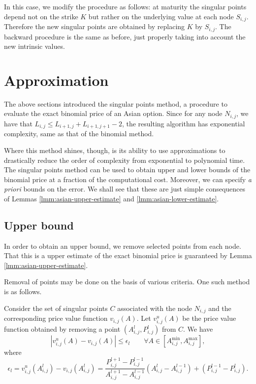 \begin{rem}[Floating]
	In this case, we modify the procedure as follows: at maturity the singular points depend not on the strike $ K $ but rather on the underlying value at each node $ S_{i,j} $. Therefore the new singular points are obtained by replacing $ K $ by $ S_{i,j} $. The backward procedure is the same as before, just properly taking into account the new intrinsic values.
\end{rem}


\section{Approximation}
The above sections introduced the singular points method, a procedure to evaluate the exact binomial price of an Asian option. Since for any node $ N_{i,j} $, we have that $ L_{i,j} \le L_{i+1,j} + L_{i+1,j+1} - 2 $, the resulting algorithm has exponential complexity, same as that of the binomial method.

Where this method shines, though, is its ability to use approximations to drastically reduce the order of complexity from exponential to polynomial time. The singular points method can be used to obtain upper and lower bounds of the binomial price at a fraction of the computational cost. Moreover, we can specify \emph{a priori} bounds on the error. We shall see that these are just simple consequences of Lemmas \ref{lmm:asian-upper-estimate} and \ref{lmm:asian-lower-estimate}.

\subsection{Upper bound}
\label{subsec:asian-ub}
In order to obtain an upper bound, we remove selected points from each node. That this is a upper estimate of the exact binomial price is guaranteed by Lemma \ref{lmm:asian-upper-estimate}.

Removal of points may be done on the basis of various criteria. One such method is as follows.

Consider the set of singular points $ C $ associated with the node $ N_{i,j} $ and the corresponding price value function $ v_{i,j} (A) $. Let $ v_{i,j}^u (A) $ be the price value function obtained by removing a point $ \left( A_{i,j}^{l}, P_{i,j}^{l} \right) $ from $ C $. We have
\begin{equation}
	\left| v_{i,j}^u (A) - v_{i,j} (A) \right|  \le  \epsilon_l  \qquad  \forall A \in \left[ A_{i,j}^{\min}, A_{i,j}^{\max} \right],
\end{equation}
where
\begin{equation}
	\epsilon_l  =  v_{i,j}^u \left( A_{i,j}^{l} \right) - v_{i,j} \left( A_{i,j}^{l} \right)  =  \frac{ P_{i,j}^{l+1} - P_{i,j}^{l-1} }{ A_{i,j}^{l+1} - A_{i,j}^{l-1} } \left( A_{i,j}^{l} - A_{i,j}^{l-1} \right) + \left( P_{i,j}^{l-1} - P_{i,j}^{l} \right) .
\end{equation}

